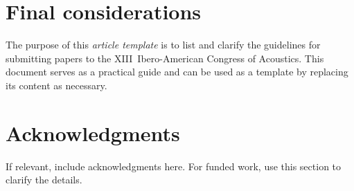 \section{Final considerations}

The purpose of this \textit{article template} is to list and clarify the guidelines for submitting papers to the XIII~Ibero-American Congress of Acoustics. This document serves as a practical guide and can be used as a template by replacing its content as necessary.

\section{Acknowledgments}

If relevant, include acknowledgments here.
%
For funded work, use this section to clarify the details.


